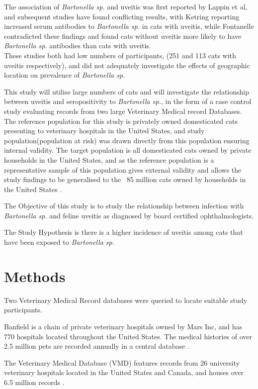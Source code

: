 \documentclass[11pt,twocolumn]{article}
\begin{document}
		The association of \emph{Bartonella sp.} and uveitis was first reported by Lappin et al\cite{Lappin1999}, and subsequent studies have found conflicting results, with Ketring reporting increased serum antibodies to \emph{Bartonella sp.} in cats with uveitis\cite{Ketring2004}, while Fontanelle contradicted these findings and found cats without uveitis more likely to have \emph{Bartonella sp.} antibodies than cats with uveitis.\\
		These studies both had low numbers of participants, (251 and 113 cats with uveitis respectively), and did not adequately investigate the effects of geographic location on prevalence of \emph{Bartonella sp.}
	
		This study will utilise large numbers of cats and will investigate the relationship between uveitis and seropositivity to  \emph{Bartonella sp.}, in the form of a case control study evaluating records from two large Veterinary Medical record Databases. \cite{bark12,UniversityVeterinary}	
		The reference population for this study is privately owned domesticated cats presenting to veterinary hospitals in the United States, and study population(population at risk)  was drawn directly from this population ensuring internal validity.
		The target population is all domesticated cats owned by private households in the United States, and as the reference population is a representative sample of this population gives external validity and allows the study findings to be generalised to the ~85 million cats owned by households in the United States \cite{HSUSown}.
		

			The Objective of this study is to study the relationship between infection with \emph{Bartonella sp.} and feline uveitis as diagnosed by board certified ophthalmologists.


			The Study Hypothesis is there is a higher incidence of uveitis among cats that have been exposed to \emph{Bartonella sp.}
\section{Methods}
	Two Veterinary Medical Record databases were queried to locate suitable study participants.


	Banfield is a chain of private veterinary hospitals owned by Mars Inc, and has 770 hospitals located throughout the United States.
	The medical histories of over 2.5 million pets are recorded annually in a central database \cite{bark12}.


	The Veterinary Medical Database (VMD) features records from 26 university veterinary hospitals located in the United States and Canada, and houses over 6.5 million records \cite{UniversityVeterinary}.
	
\end{document}
